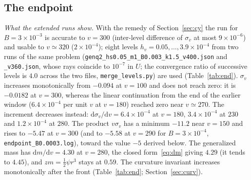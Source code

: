 \documentclass[11pt]{article}
\begin{document}
\subsection{The endpoint}
\label{sec:endpoint}

\emph{What the extended runs show.} With the remedy of Section~\ref{sec:cy} the run for $B=3\times10^{-3}$ is accurate to $v=300$ (inter-level difference of $\sigma_v$ at most $9\times10^{-6}$) and usable to $v\simeq320$ ($2\times10^{-4}$); eight levels $h_v=0.05,\ldots,3.9\times10^{-4}$ from two runs of the same problem (\texttt{genq2\_hs0.05\_m1\_B0.003\_k1.5\_v400.json} and \texttt{\_v360.json}, whose rays coincide to $10^{-7}$ in $U$; the convergence ratio of successive levels is $4.0$ across the two files, \texttt{merge\_levels.py}) are used (Table~\ref{tab:end}). $\sigma_v$ increases monotonically from $-0.094$ at $v=100$ and does not reach zero: it is $-0.0182$ at $v=300$, whereas the linear continuation from the end of the earlier window ($6.4\times10^{-4}$ per unit $v$ at $v=180$) reached zero near $v\simeq270$. The increment decreases instead: $\mathrm{d}\sigma_v/\mathrm{d}v=6.4\times10^{-4}$ at $v=180$, $3.4\times10^{-4}$ at $230$ and $1.2\times10^{-4}$ at $280$. The product $v\sigma_v$ has a minimum $-11.2$ near $v=150$ and rises to $-5.47$ at $v=300$ (and to $-5.58$ at $v=290$ for $B=3\times10^{-4}$, \texttt{endpoint\_B0.0003.log}), toward the value $-5$ derived below. The generalized mass has $\mathrm{d}m/\mathrm{d}v=4.30$ at $v=280$, the closed form~\eqref{eq:dm} giving $4.29$ (it tends to $4.45$), and $zm=\tfrac12\psi r^{3}$ stays at $0.59$. The curvature invariant increases monotonically after the front (Table~\ref{tab:end}; Section~\ref{sec:curv}).
\end{document}
